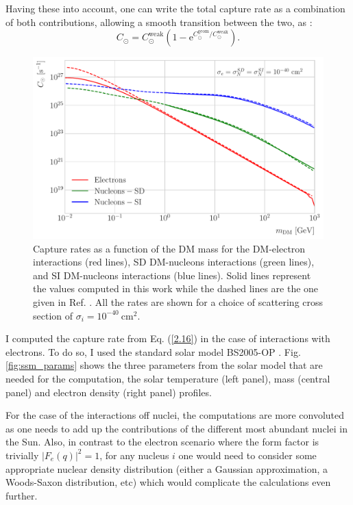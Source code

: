 Having these into account, one can write the total capture rate as a combination of both contributions, allowing a smooth transition between the two, as \cite{Bernal2012}:
\begin{equation}\label{2.16}
	C_{\odot} = C_{\odot}^{\mathrm{weak}} \left(1-\mathrm{e}^{C_{\odot}^{\mathrm{geom}}/C_{\odot}^{\mathrm{weak}}}\right).
\end{equation}

\begin{figure}[t]
	\centering
	\includegraphics[width=0.9\linewidth]{Images/DM_Analysis/capture_rates.pdf}
	\caption[Capture rates as a function of the DM mass for the DM-electron interactions, SD DM-nucleons interactions, and SI DM-nucleons interactions.]{Capture rates as a function of the DM mass for the DM-electron interactions (red lines), SD DM-nucleons interactions (green lines), and SI DM-nucleons interactions (blue lines). Solid lines represent the values computed in this work while the dashed lines are the one given in Ref. \cite{Palomares2017}. All the rates are shown for a choice of scattering cross section of $\sigma_{i} = 10^{-40} \ \mathrm{cm}^{2}$.}
	\label{fig:capture_rates}
\end{figure}

I computed the capture rate from Eq. (\ref{2.16}) in the case of interactions with electrons. To do so, I used the standard solar model BS2005-OP \cite{Bahcall2004}. Fig. \ref{fig:ssm_params} shows the three parameters from the solar model that are needed for the computation, the solar temperature (left panel), mass (central panel) and electron density (right panel) profiles.

For the case of the interactions off nuclei, the computations are more convoluted as one needs to add up the contributions of the different most abundant nuclei in the Sun. Also, in contrast to the electron scenario where the form factor is trivially $|F_{e}(q)|^{2} = 1$, for any nucleus $i$ one would need to consider some appropriate nuclear density distribution (either a Gaussian approximation, a Woods-Saxon distribution, etc) which would complicate the calculations even further.

